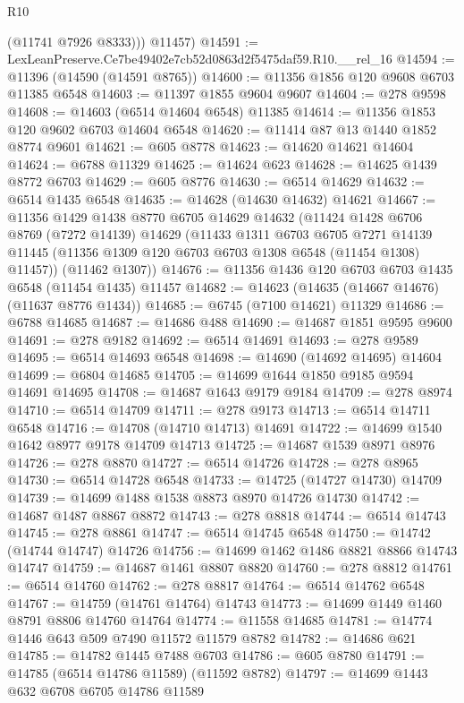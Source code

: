 \begin{lexlean}{R10}
\begin{coremodule}
          (@11741 @7926 @8333)))
      @11457)
@14591 := LexLeanPreserve.Ce7be49402e7cb52d0863d2f5475daf59.R10.__rel_16
@14594 := @11396 (@14590 (@14591 @8765))
@14600 := @11356 @1856 @120 @9608 @6703 @11385 @6548
@14603 := @11397 @1855 @9604 @9607
@14604 := @278 @9598
@14608 := @14603 (@6514 @14604 @6548) @11385
@14614 := @11356 @1853 @120 @9602 @6703 @14604 @6548
@14620 := @11414 @87 @13 @1440 @1852 @8774 @9601
@14621 := @605 @8778
@14623 := @14620 @14621 @14604
@14624 := @6788 @11329
@14625 := @14624 @623
@14628 := @14625 @1439 @8772 @6703
@14629 := @605 @8776
@14630 := @6514 @14629
@14632 := @6514 @1435 @6548
@14635 := @14628 (@14630 @14632) @14621
@14667 := @11356
    @1429
    @1438
    @8770
    @6705
    @14629
    @14632
    (@11424
      @1428
      @6706
      @8769
      (@7272 @14139)
      @14629
      (@11433
        @1311
        @6703
        @6705
        @7271
        @14139
        @11445
        (@11356 @1309 @120 @6703 @6703 @1308 @6548 (@11454 @1308) @11457))
      (@11462 @1307))
@14676 := @11356 @1436 @120 @6703 @6703 @1435 @6548 (@11454 @1435) @11457
@14682 := @14623 (@14635 (@14667 @14676) (@11637 @8776 @1434))
@14685 := @6745 (@7100 @14621) @11329
@14686 := @6788 @14685
@14687 := @14686 @488
@14690 := @14687 @1851 @9595 @9600
@14691 := @278 @9182
@14692 := @6514 @14691
@14693 := @278 @9589
@14695 := @6514 @14693 @6548
@14698 := @14690 (@14692 @14695) @14604
@14699 := @6804 @14685
@14705 := @14699 @1644 @1850 @9185 @9594 @14691 @14695
@14708 := @14687 @1643 @9179 @9184
@14709 := @278 @8974
@14710 := @6514 @14709
@14711 := @278 @9173
@14713 := @6514 @14711 @6548
@14716 := @14708 (@14710 @14713) @14691
@14722 := @14699 @1540 @1642 @8977 @9178 @14709 @14713
@14725 := @14687 @1539 @8971 @8976
@14726 := @278 @8870
@14727 := @6514 @14726
@14728 := @278 @8965
@14730 := @6514 @14728 @6548
@14733 := @14725 (@14727 @14730) @14709
@14739 := @14699 @1488 @1538 @8873 @8970 @14726 @14730
@14742 := @14687 @1487 @8867 @8872
@14743 := @278 @8818
@14744 := @6514 @14743
@14745 := @278 @8861
@14747 := @6514 @14745 @6548
@14750 := @14742 (@14744 @14747) @14726
@14756 := @14699 @1462 @1486 @8821 @8866 @14743 @14747
@14759 := @14687 @1461 @8807 @8820
@14760 := @278 @8812
@14761 := @6514 @14760
@14762 := @278 @8817
@14764 := @6514 @14762 @6548
@14767 := @14759 (@14761 @14764) @14743
@14773 := @14699 @1449 @1460 @8791 @8806 @14760 @14764
@14774 := @11558 @14685
@14781 := @14774 @1446 @643 @509 @7490 @11572 @11579 @8782
@14782 := @14686 @621
@14785 := @14782 @1445 @7488 @6703
@14786 := @605 @8780
@14791 := @14785 (@6514 @14786 @11589) (@11592 @8782)
@14797 := @14699 @1443 @632 @6708 @6705 @14786 @11589

\end{coremodule}
\end{lexlean}
